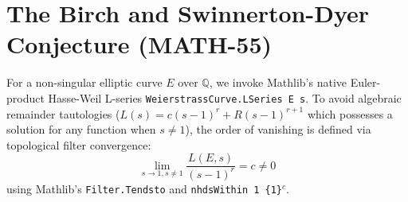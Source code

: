 \documentclass[11pt,a4paper]{article}
\begin{document}


\section{The Birch and Swinnerton-Dyer Conjecture (MATH-55)}
For a non-singular elliptic curve $E$ over $\mathbb{Q}$, we invoke Mathlib's native Euler-product Hasse-Weil L-series \texttt{WeierstrassCurve.LSeries E s}. To avoid algebraic remainder tautologies ($L(s) = c(s-1)^r + R(s-1)^{r+1}$ which possesses a solution for any function when $s \ne 1$), the order of vanishing is defined via topological filter convergence:
\begin{equation}
\lim_{s \to 1, s \ne 1} \frac{L(E, s)}{(s - 1)^r} = c \ne 0
\end{equation}
using Mathlib's \texttt{Filter.Tendsto} and \texttt{nhdsWithin 1 \{1\}$^c$}.


\end{document}
